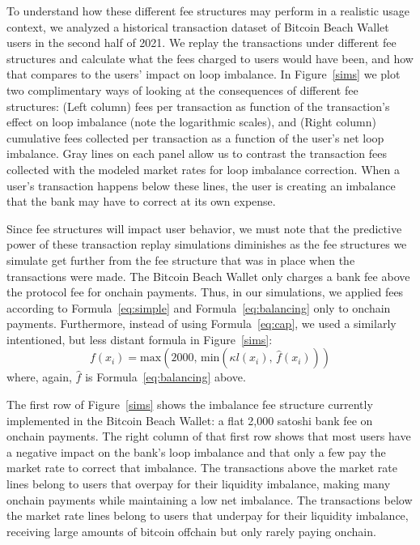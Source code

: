 \documentclass[10pt,twocolumn]{article}
\begin{document}
To understand how these different fee structures
may perform in a realistic usage context,
we analyzed a historical transaction dataset of
Bitcoin Beach Wallet users in the second half of 2021.
We replay the transactions under different fee structures
and calculate what the fees charged to users would have been,
and how that compares to the users' impact on loop imbalance.
In Figure~\ref{sims}
we plot two complimentary ways
of looking at the consequences of different fee structures:
(Left column) fees per transaction as function of the transaction's effect on  loop imbalance
(note the logarithmic scales), and
(Right column) cumulative fees collected per transaction
as a function of the user's net loop imbalance.
Gray lines on each panel allow us to contrast the
transaction fees collected with the modeled market rates for
loop imbalance correction.
When a user's transaction happens below these lines,
the user is creating an imbalance
that the bank may have to correct at its own expense.

Since fee structures will impact user behavior,
we must note that the predictive power of these transaction replay simulations
diminishes as the fee structures we simulate get further from
the fee structure that was in place when the transactions were made.
The Bitcoin Beach Wallet only charges a bank fee
above the protocol fee for onchain payments.
Thus, in our simulations, we applied fees according to
Formula~\ref{eq:simple} and Formula~\ref{eq:balancing}
only to onchain payments.
Furthermore, instead of using Formula~\ref{eq:cap},
we used a similarly intentioned, but less distant formula
in Figure~\ref{sims}:
\begin{equation} \label{eq:bbw}
	f(x_i) = \mathrm{max}\left( 2000,\,
		\mathrm{min}\left( \kappa l(x_i),\, \hat{f}(x_i) \right)\right)
\end{equation}
where, again, $\hat{f}$ is Formula~\ref{eq:balancing} above.

The first row of Figure~\ref{sims} shows the imbalance
fee structure currently implemented in the Bitcoin Beach Wallet:
a flat 2,000 satoshi bank fee on onchain payments.
The right column of that first row shows that
most users have a negative impact on the bank's loop imbalance
and that only a few pay the market rate to correct that imbalance.
The transactions above the market rate lines belong to users that overpay for their liquidity imbalance,
making many onchain payments while maintaining a low net imbalance.
The transactions below the market rate lines belong to users that underpay for their liquidity imbalance,
receiving large amounts of bitcoin offchain but only rarely paying onchain.
\end{document}
